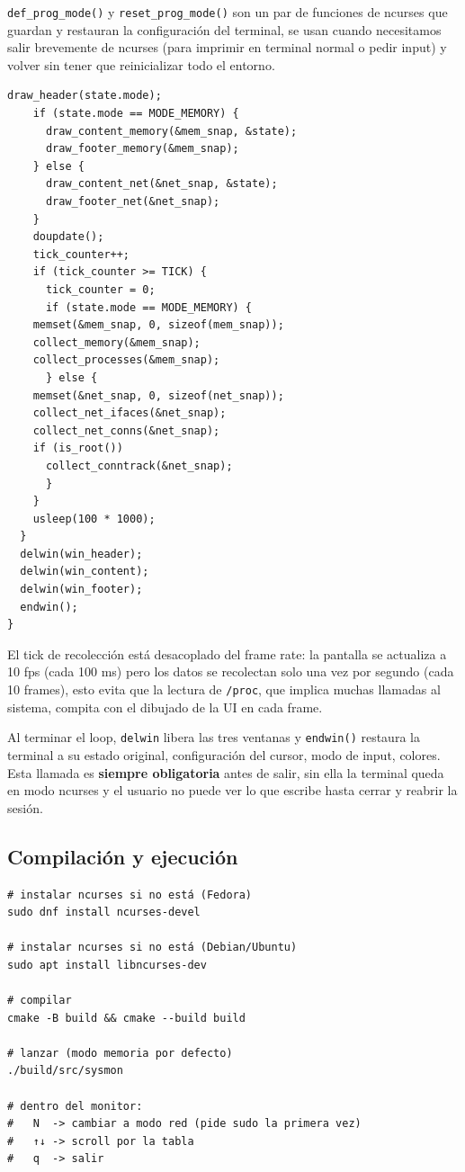 \documentclass[12pt,letterpaper]{article}
\begin{document}
\medskip

\texttt{def\_prog\_mode()} y \texttt{reset\_prog\_mode()} son un par de funciones de ncurses que guardan y
restauran la configuración del terminal, se usan cuando necesitamos salir brevemente de ncurses
(para imprimir en terminal normal o pedir input) y volver sin tener que reinicializar todo el entorno.

\begin{lstlisting}[style=modernc, caption={\texttt{ui.c} ui\_run() tick y cierre}]
    draw_header(state.mode);
    if (state.mode == MODE_MEMORY) {
      draw_content_memory(&mem_snap, &state);
      draw_footer_memory(&mem_snap);
    } else {
      draw_content_net(&net_snap, &state);
      draw_footer_net(&net_snap);
    }
    doupdate();
    tick_counter++;
    if (tick_counter >= TICK) {
      tick_counter = 0;
      if (state.mode == MODE_MEMORY) {
	memset(&mem_snap, 0, sizeof(mem_snap));
	collect_memory(&mem_snap);
	collect_processes(&mem_snap);
      } else {
	memset(&net_snap, 0, sizeof(net_snap));
	collect_net_ifaces(&net_snap);
	collect_net_conns(&net_snap);
	if (is_root())
	  collect_conntrack(&net_snap);
      }
    }
    usleep(100 * 1000);
  }
  delwin(win_header);
  delwin(win_content);
  delwin(win_footer);
  endwin();
}
\end{lstlisting}

El tick de recolección está desacoplado del frame rate: la pantalla se actualiza a 10 fps (cada 100 ms) pero los
datos se recolectan solo una vez por segundo (cada 10 frames), esto evita que la lectura de \texttt{/proc}, que
implica muchas llamadas al sistema, compita con el dibujado de la UI en cada frame.

\medskip

Al terminar el loop, \texttt{delwin} libera las tres ventanas y \texttt{endwin()} restaura la terminal a su
estado original, configuración del cursor, modo de input, colores. Esta llamada es \textbf{siempre obligatoria}
antes de salir, sin ella la terminal queda en modo ncurses y el usuario no puede ver lo que escribe hasta cerrar
y reabrir la sesión.

\subsection*{Compilación y ejecución}

\begin{Verbatim}[frame=single, rulecolor=\color{black!20}, fontsize=\small]
# instalar ncurses si no está (Fedora)
sudo dnf install ncurses-devel

# instalar ncurses si no está (Debian/Ubuntu)
sudo apt install libncurses-dev

# compilar
cmake -B build && cmake --build build

# lanzar (modo memoria por defecto)
./build/src/sysmon

# dentro del monitor:
#   N  -> cambiar a modo red (pide sudo la primera vez)
#   ↑↓ -> scroll por la tabla
#   q  -> salir
\end{Verbatim}
\end{document}
